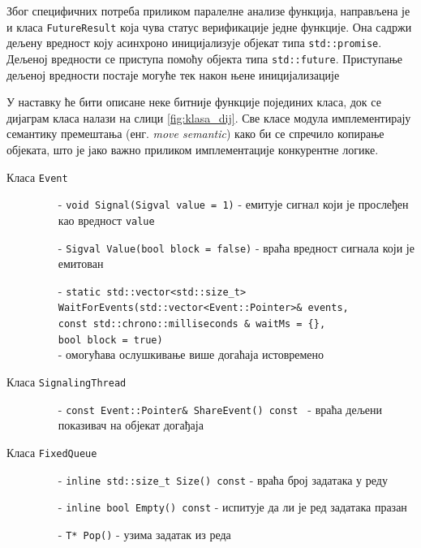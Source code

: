 \documentclass[12pt,oneside]{memoir}
\begin{document}
Због специфичних потреба приликом паралелне анализе функција, направљена је и класа \texttt{FutureResult} која чува статус верификације једне функције. Она садржи дељену вредност коју асинхроно иницијализује објекат типа \texttt{std::promise}. Дељеној вредности се приступа помоћу објекта типа \texttt{std::future}. Приступање дељеној вредности постаје могуће тек након њене иницијализације


У наставку ће бити описане неке битније функције појединих класа, док се дијаграм класа налази на слици \ref{fig:klasa_dij}. Све класе модула имплементирају семантику премештања (енг. \textit{move semantic}) како би се спречило копирање објеката, што је јако важно приликом имплементације конкурентне логике. 

\begin{description}
	\item[Класа \texttt{Event}]\leavevmode
		\begin{itemize}
			\item[-] \texttt{void Signal(Sigval value = 1)} - емитује сигнал који је прослеђен као вредност \texttt{value}
			\item[-] \texttt{Sigval Value(bool block = false)} - враћа вредност сигнала који је емитован  
			\item[-] \texttt{static std::vector<std::size\_t>
			\\
			 WaitForEvents(std::vector<Event::Pointer>\& events,
			 \\
			 const std::chrono::milliseconds \& waitMs = \{\}, 
			 \\ 
			 bool block = true)} 
			 \\ - омогућава ослушкивање више догаћаја истовремено
		\end{itemize}			
	\item[Класа \texttt{SignalingThread}]\leavevmode
		\begin{itemize}
			\item[-] \texttt{const Event::Pointer\& ShareEvent() const } - враћа дељени показивач на објекат догађаја 	
		\end{itemize}			
	\item[Класа \texttt{FixedQueue}]\leavevmode
		\begin{itemize}
			\item[-] \texttt{inline std::size\_t Size() const} - враћа број задатака у реду
			\item[-] \texttt{inline bool Empty() const} - испитује да ли је ред задатака 	празан	
			\item[-] \texttt{T* Pop()} - узима задатак из реда 

\end{itemize}
\end{description}
\end{document}
